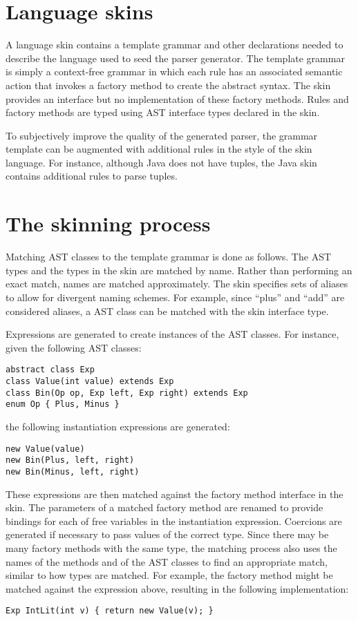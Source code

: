 \documentclass[nocopyrightspace,10pt]{sigplanconf}
\renewcommand\c[1]{\normalfont{\texttt{#1}}}
\begin{document}
\section{Language skins}
\label{sec:intro}

A language skin contains a template grammar and other declarations
needed to describe the language used to seed the parser generator.
The template grammar
is simply a context-free grammar in which
each
rule has an associated semantic action that
invokes a factory method to create the abstract syntax.
The skin provides an interface
but no implementation of these factory methods.
Rules and factory methods are typed using AST interface types declared
in the skin.

To subjectively improve the quality
of the generated parser,
the grammar
template can be augmented with additional rules in the style of the 
skin language.
For instance, although Java does not have tuples,
the Java skin contains additional rules to parse tuples.

\section{The skinning process}
\label{sec:matching}

Matching AST classes to the template grammar is done as follows.
The AST types and the types in the skin are matched
by name.
Rather than performing an exact match, names are matched approximately.
The skin specifies sets of aliases
to allow for divergent naming schemes. For example, since ``plus''
and ``add'' are considered aliases, a
\c{PlusExp} AST class can be matched with the \c{Add} skin interface type.

Expressions are generated to create instances of the AST classes.
For instance, given the following AST classes:
\begin{verbatim}
abstract class Exp
class Value(int value) extends Exp
class Bin(Op op, Exp left, Exp right) extends Exp
enum Op { Plus, Minus }
\end{verbatim}
the following instantiation expressions are generated:
\begin{verbatim}
new Value(value)
new Bin(Plus, left, right)
new Bin(Minus, left, right)
\end{verbatim}
These expressions are then matched against the factory method interface
in the skin. The parameters of a matched factory method are renamed
to provide bindings for each of
free variables in the instantiation expression. Coercions
are generated if necessary to pass values of the correct type. 
Since there may be many factory methods with the same type,
the matching process also uses the names of the methods and of the AST
classes to find an appropriate match, similar to how types are matched. 
For example, the \c{IntLit} factory method might be matched against the
\c{Value} expression above, resulting in the following implementation:
\begin{verbatim}
Exp IntLit(int v) { return new Value(v); }
\end{verbatim}
\end{document}
